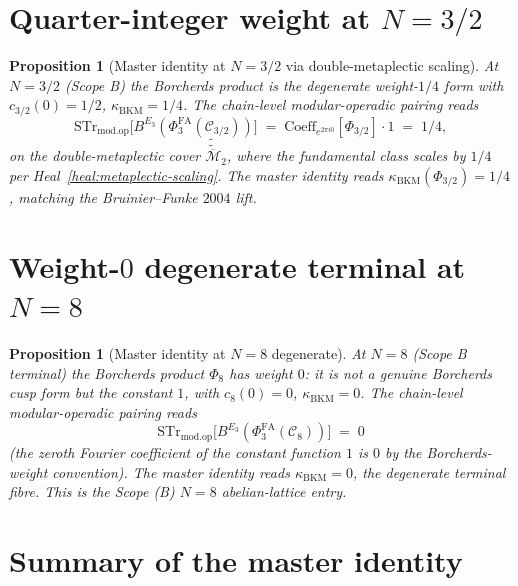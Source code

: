 \documentclass[11pt]{amsart}
\newtheorem{proposition}[theorem]{Proposition}
\providecommand{\cC}{\mathcal{C}}
\providecommand{\PhiFA}{\Phi^{\mathrm{FA}}}
\providecommand{\Mbar}{\overline{\mathcal{M}}}
\providecommand{\STr}{\mathrm{STr}}
\providecommand{\modop}{\mathrm{mod.op}}
\providecommand{\kBKM}{\kappa_{\mathrm{BKM}}}
\begin{document}
\section{Quarter-integer weight at $N = 3/2$}
\label{sec:quarter-integer-n-3half}

\begin{proposition}[Master identity at $N = 3/2$ via double-metaplectic
scaling]
\label{prop:master-n-3half}
At $N = 3/2$ (Scope B) the Borcherds product is the degenerate
weight-$1/4$ form with $c_{3/2}(0) = 1/2$, $\kBKM = 1/4$. The
chain-level modular-operadic pairing reads
\[
 \STr_{\modop}\bigl[B^{E_3}(\PhiFA_3(\cC_{3/2}))\bigr]
 \;=\; \mathrm{Coeff}_{e^{2\pi i 0}}[\Phi_{3/2}] \cdot 1 \;=\; 1/4,
\]
on the double-metaplectic cover $\widetilde{\widetilde{\Mbar}}_2$,
where the fundamental class scales by $1/4$ per
Heal~\ref{heal:metaplectic-scaling}. The master identity reads
$\kBKM(\Phi_{3/2}) = 1/4$, matching the Bruinier--Funke $2004$ lift.
\end{proposition}

\section{Weight-$0$ degenerate terminal at $N = 8$}
\label{sec:terminal-n8}

\begin{proposition}[Master identity at $N = 8$ degenerate]
\label{prop:master-n8-degenerate}
At $N = 8$ (Scope B terminal) the Borcherds product $\Phi_8$ has
weight $0$: it is not a genuine Borcherds cusp form but the constant
$1$, with $c_8(0) = 0$, $\kBKM = 0$. The chain-level
modular-operadic pairing reads
\[
 \STr_{\modop}\bigl[B^{E_3}(\PhiFA_3(\cC_8))\bigr]
 \;=\; 0
\]
(the zeroth Fourier coefficient of the constant function $1$ is $0$
by the Borcherds-weight convention). The master identity reads
$\kBKM = 0$, the degenerate terminal fibre. This is the Scope (B)
$N = 8$ abelian-lattice entry.
\end{proposition}

\section{Summary of the master identity}
\label{sec:master-summary}
\end{document}
